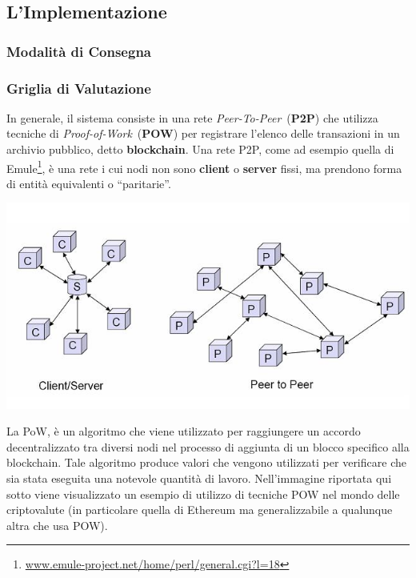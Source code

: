 \documentclass[12pt,a4paper,draft]{article}
\begin{document}
\subsection{L'Implementazione}
%
\subsubsection{Modalità di Consegna}
%
\subsubsection{Griglia di Valutazione}
%
In generale, il sistema consiste in una rete \textit{Peer-To-Peer}~(\textbf{P2P}) che utilizza tecniche di \textit{Proof-of-Work}~(\textbf{POW}) per registrare l'elenco delle transazioni in un archivio pubblico, detto \textbf{blockchain}. 
Una rete P2P, come ad esempio quella di Emule\footnote{\url{www.emule-project.net/home/perl/general.cgi?l=18}}, è una rete i cui nodi non sono \textbf{client} o \textbf{server} fissi, ma prendono forma di entità equivalenti o ``paritarie''.
%
\begin{center}
    \includegraphics[width=.7\linewidth]{img/p2p}
\end{center}
%
La PoW, è un algoritmo che viene utilizzato per raggiungere un accordo decentralizzato tra diversi nodi nel processo di aggiunta di un blocco specifico alla blockchain.
Tale algoritmo produce valori che vengono utilizzati per verificare che sia stata eseguita una notevole quantità di lavoro. Nell'immagine riportata qui sotto viene visualizzato un esempio di utilizzo di tecniche POW nel mondo delle criptovalute (in particolare quella di Ethereum ma generalizzabile a qualunque altra che usa POW).
%
\end{document}
